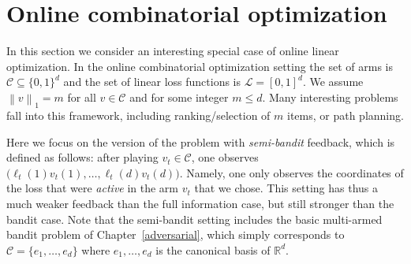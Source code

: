 \documentclass[11pt]{hackednow}
\newcommand{\R}{\mathbb{R}}
\newcommand{\cL}{\mathcal{L}}
\newcommand{\cC}{\mathcal{C}}
\newcommand{\norm}[1]{\left\|{#1}\right\|}
\begin{document}
\section{Online combinatorial optimization} \label{sec:semibandit}
In this section we consider an interesting special case of online linear optimization. In the online combinatorial optimization setting the set of arms is $\cC \subseteq \{0,1\}^d$ and the set of linear loss functions is $\cL = [0,1]^d$. We assume $\norm{v}_1 = m$ for all $v\in\cC$ and for some integer $m \le d$. Many interesting problems fall into this framework, including ranking/selection of $m$ items, or path planning.

Here we focus on the version of the problem with {\em semi-bandit} feedback, which is defined as follows: after playing $v_t \in \cC$, one observes $\bigl(\ell_t(1) v_t(1), \hdots, \ell_t(d) v_t(d)\bigr)$. Namely, one only observes the coordinates of the loss that were {\em active} in the arm $v_t$ that we chose. This setting has thus a much weaker feedback than the full information case, but still stronger than the bandit case. Note that the semi-bandit setting includes the basic multi-armed bandit problem of Chapter~\ref{adversarial}, which simply corresponds to $\cC = \{e_1, \hdots, e_d\}$ where $e_1, \hdots, e_d$ is the canonical basis of $\R^d$.
\end{document}
